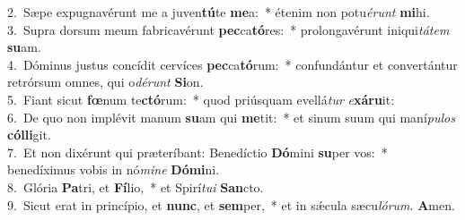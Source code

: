 {2.~}Sæpe expugnavérunt me a juven\textbf{tú}te \textbf{me}a:~* étenim non potu\textit{é}\textit{runt} \textbf{mi}hi.\\
{3.~}Supra dorsum meum fabricavérunt \textbf{pec}ca\textbf{tó}res:~* prolongavérunt iniqui\textit{tá}\textit{tem} \textbf{su}am.\\
{4.~}Dóminus justus concídit cervíces \textbf{pec}ca\textbf{tó}rum:~* confundántur et convertántur retrórsum omnes, qui o\textit{dé}\textit{runt} \textbf{Si}on.\\
{5.~}Fiant sicut \textbf{fœ}num te\textbf{ctó}rum:~* quod priúsquam evellá\textit{tur} \textit{e}\textbf{xá}\textbf{ru}it:\\
{6.~}De quo non implévit manum \textbf{su}am qui \textbf{me}tit:~* et sinum suum qui maní\textit{pu}\textit{los} \textbf{cól}\textbf{li}git.\\
{7.~}Et non dixérunt qui præteríbant: Benedíctio \textbf{Dó}mini \textbf{su}per vos:~* benedíximus vobis in nó\textit{mi}\textit{ne} \textbf{Dó}\textbf{mi}ni.\\
{8.~}Glória \textbf{Pa}tri, et \textbf{Fí}lio,~* et Spirí\textit{tu}\textit{i} \textbf{San}cto.\\
{9.~}Sicut erat in princípio, et \textbf{nunc}, et \textbf{sem}per,~* et in sǽcula sæcu\textit{ló}\textit{rum}. \textbf{A}men.\\
